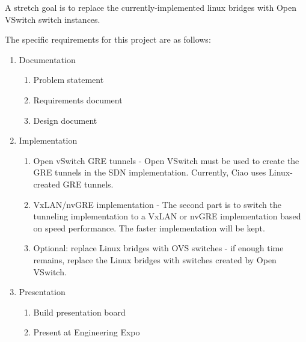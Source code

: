\documentclass[10pt,letterpaper,onecolumn,draftclsnofoot]{IEEEtran}
\begin{document}
A stretch goal is to replace the currently-implemented linux bridges with
Open VSwitch switch instances.

The specific requirements for this project are as follows:

\begin{enumerate}
	\item Documentation
		\begin{enumerate}
			\item Problem statement
			\item Requirements document
			\item Design document
		\end{enumerate}
	\item Implementation
		\begin{enumerate}
			\item Open vSwitch GRE tunnels - Open VSwitch must be
				used to create the GRE tunnels in the SDN
				implementation. Currently, Ciao uses
				Linux-created GRE tunnels.
			\item VxLAN/nvGRE implementation - The second part is
				to switch the tunneling implementation to a
				VxLAN or nvGRE implementation based on speed
				performance. The faster implementation will be
				kept.
			\item Optional: replace Linux bridges with OVS
				switches - if enough time remains, replace the
				Linux bridges with switches created by Open
				VSwitch.
		\end{enumerate}
	\item Presentation
		\begin{enumerate}
			\item Build presentation board
			\item Present at Engineering Expo
		\end{enumerate}
\end{enumerate}

\clearpage
\end{document}
